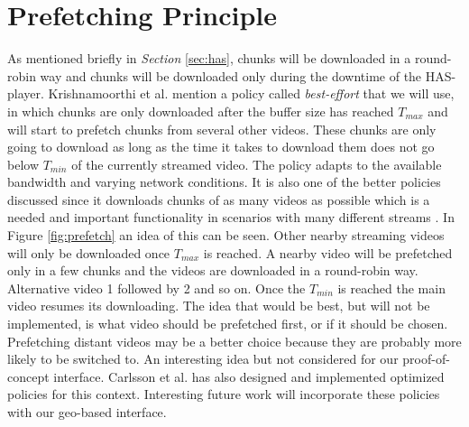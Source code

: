 \section{Prefetching Principle}
\label{sec:prefetching}

As mentioned briefly in \textit{Section} \ref{sec:has}, chunks will be downloaded in a round-robin way and chunks will be downloaded only during the downtime of the HAS-player. Krishnamoorthi et al. \cite{bandawarePrefetch} mention a policy called \textit{best-effort} that we will use, in which chunks are only downloaded after the buffer size has reached $T_{max}$ and will start to prefetch chunks from several other videos. These chunks are only going to download as long as the time it takes to download them does not go below $T_{min}$ of the currently streamed video. The policy adapts to the available bandwidth and varying network conditions. It is also one of the better policies discussed since it downloads chunks of as many videos as possible which is a needed and important functionality in  scenarios with many different streams \cite{bandawarePrefetch}. In Figure \ref{fig:prefetch} an idea of this can be seen. Other nearby streaming videos will only be downloaded once $T_{max}$ is reached. A nearby video will be prefetched only in a few chunks and the videos are downloaded in a round-robin way. Alternative video 1 followed by 2 and so on. Once the $T_{min}$ is reached the main video resumes its downloading. The idea that would be best, but will not be implemented, is what video should be prefetched first, or if it should be chosen. Prefetching distant videos may be a better choice because they are probably more likely to be switched to. An interesting idea but not considered for our proof-of-concept interface. Carlsson et al. \cite{optimizedstreaming} has also designed and implemented optimized policies for this context. Interesting future work will incorporate these policies with our geo-based interface.

